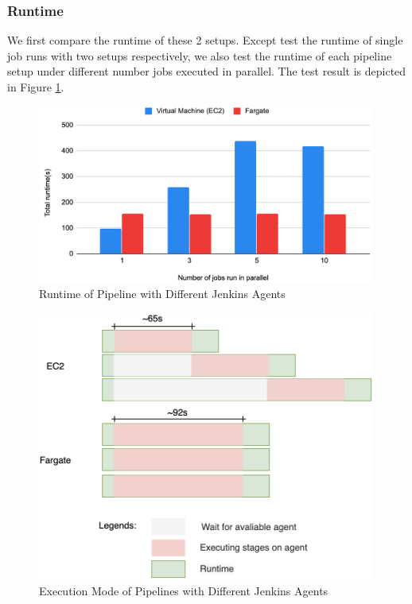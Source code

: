 \subsubsection{Runtime}
We first compare the runtime of these 2 setups. Except test the runtime of single job runs with two setups respectively, we also test the runtime of each pipeline setup under different number jobs executed in parallel. The test result is depicted in Figure \ref{fig:runtime}.
\begin{figure}[h]
    \centering
    \includegraphics[width=0.99\textwidth]{pics/runtime.png}
    \caption{Runtime of Pipeline with Different Jenkins Agents}
    \label{fig:runtime}
\end{figure}
\begin{figure}[h]
    \centering
    \includegraphics[width=0.99\textwidth]{pics/parallel.png}
    \caption{Execution Mode of Pipelines with Different Jenkins Agents}
    \label{fig:parallel}
\end{figure}
